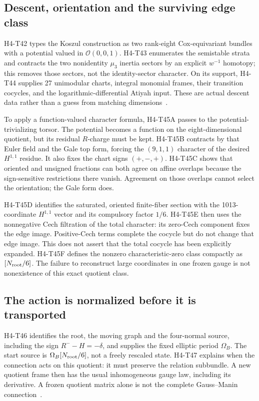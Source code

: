 \documentclass[11pt]{article}
\newcommand{\cO}{\mathcal{O}}
\theoremstyle{definition}
\theoremstyle{remark}
\begin{document}
\subsection{Descent, orientation and the surviving edge class}
\label{sec:root-descent}

H4-T42 types the Koszul construction as two rank-eight Cox-equivariant
bundles with a potential valued in \(\cO(0,0,1)\). H4-T43 enumerates the
semistable strata and contracts the two nonidentity \(\mu_3\) inertia
sectors by an explicit \(w^{-1}\) homotopy; this removes those sectors,
not the identity-sector character. On its support, H4-T44 supplies
27 unimodular charts, integral monomial frames, their transition cocycles,
and the logarithmic-differential Atiyah input. These are actual descent
data rather than a guess from matching dimensions~\cite{FluxRootDescent}.

To apply a function-valued character formula, H4-T45A passes to the
potential-trivializing torsor. The potential becomes a function on the
eight-dimensional quotient, but its residual \(R\)-charge must be kept.
H4-T45B contracts by that Euler field and the Gale top form, forcing the
\((9,1,1)\) character of the desired \(H^{1,1}\) residue. It also fixes
the chart signs \((+,-,+)\). H4-T45C shows that oriented and unsigned
fractions can both agree on affine overlaps because the sign-sensitive
restrictions there vanish. Agreement on those overlaps cannot select the
orientation; the Gale form does.

H4-T45D identifies the saturated, oriented finite-fiber section with the
1013-coordinate \(H^{1,1}\) vector and its compulsory factor \(1/6\).
H4-T45E then uses the nonnegative Cech filtration of the total character:
its zero-Cech component fixes the edge image. Positive-Cech terms complete
the cocycle but do not change that edge image. This does not assert that
the total cocycle has been explicitly expanded. H4-T45F defines the
nonzero characteristic-zero class compactly as \([N_{\rm root}/6]\).
The failure to reconstruct large coordinates in one frozen gauge is not
nonexistence of this exact quotient class.

\subsection{The action is normalized before it is transported}
\label{sec:root-action}

H4-T46 identifies the root, the moving graph and the four-normal source,
including the sign \(R^- - H=-\delta\), and supplies the fixed elliptic
period \(\Omega_B\). The start source is
\(\Omega_B[N_{\rm root}/6]\), not a freely rescaled state.
H4-T47 explains when the connection acts on this quotient: it must
preserve the relation subbundle. A new quotient frame then has the usual
inhomogeneous gauge law, including its derivative. A frozen quotient
matrix alone is not the complete Gauss--Manin connection~\cite{FluxRootAction}.
\end{document}
